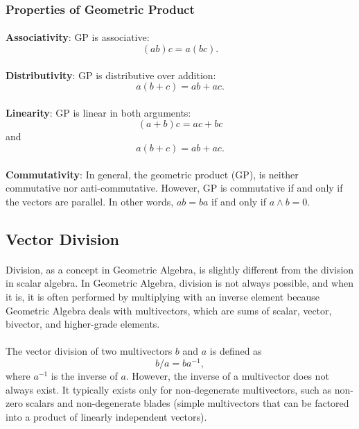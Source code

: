 \documentclass{article}
\begin{document}
\subsubsection{\textbf{Properties of Geometric Product}}

\paragraph{}\textbf{Associativity}: GP is associative: $$(ab)c = a(bc).$$

\paragraph{}\textbf{Distributivity}: GP is distributive over addition: $$a(b+c) = ab + ac.$$

\paragraph{}\textbf{Linearity}: GP is linear in both arguments: 
$$(a+b)c = ac + bc$$ and $$a(b+c) = ab + ac.$$

\paragraph{}\textbf{Commutativity}: In general, the geometric product (GP), is neither commutative nor anti-commutative.
However, GP is commutative if and only if the vectors are parallel. 
In other words, $ab = ba$ if and only if $a \wedge b = 0$.

\subsection{\textbf{Vector Division}}

\paragraph{}
    Division, as a concept in Geometric Algebra, is slightly different from the division in scalar algebra. 
    In Geometric Algebra, division is not always possible, and when it is, it is often performed by 
    multiplying with an inverse element because Geometric Algebra deals with multivectors, which are 
    sums of scalar, vector, bivector, and higher-grade elements. 

\paragraph{}
    The vector division of two multivectors $b$ and $a$ is defined as $$b/a = ba^{-1},$$
    where $a^{-1}$ is the inverse of $a$. However, the inverse of a multivector does not always 
    exist. It typically exists only for non-degenerate multivectors, such as non-zero scalars 
    and non-degenerate blades (simple multivectors that can be factored into a product of linearly 
    independent vectors). 
    
\end{document}
